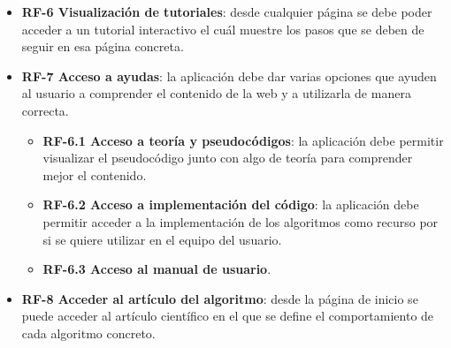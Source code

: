 \begin{itemize}
\begin{itemize}
	\end{itemize}
	\item \textbf{RF-6 Visualización de tutoriales}: desde cualquier página se debe poder acceder a un tutorial interactivo el cuál muestre los pasos que se deben de seguir en esa página concreta.
	\item \textbf{RF-7 Acceso a ayudas}: la aplicación debe dar varias opciones que ayuden al usuario a comprender el contenido de la web y a utilizarla de manera correcta.
	\begin{itemize}
		\item \textbf{RF-6.1 Acceso a teoría y pseudocódigos}: la aplicación debe permitir visualizar el pseudocódigo junto con algo de teoría para comprender mejor el contenido.
		\item \textbf{RF-6.2 Acceso a implementación del código}: la aplicación debe permitir acceder a la implementación de los algoritmos como recurso por si se quiere utilizar en el equipo del usuario.
		\item \textbf{RF-6.3 Acceso al manual de usuario}.
	\end{itemize}
	\item \textbf{RF-8 Acceder al artículo del algoritmo}: desde la página de inicio se puede acceder al artículo científico en el que se define el comportamiento de cada algoritmo concreto.
\end{itemize}

